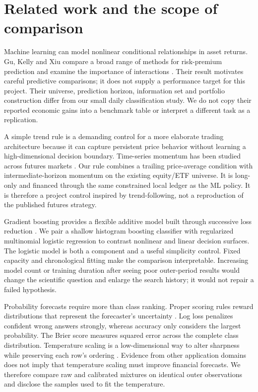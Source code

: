 \section{Related work and the scope of comparison}\label{sec:section-02}

Machine learning can model nonlinear conditional relationships in asset returns. Gu, Kelly and Xiu compare a broad range of methods for risk-premium prediction and examine the importance of interactions \citep{gu2020}. Their result motivates careful predictive comparisons; it does not supply a performance target for this project. Their universe, prediction horizon, information set and portfolio construction differ from our small daily classification study. We do not copy their reported economic gains into a benchmark table or interpret a different task as a replication.

A simple trend rule is a demanding control for a more elaborate trading architecture because it can capture persistent price behavior without learning a high-dimensional decision boundary. Time-series momentum has been studied across futures markets \citep{momentum2012}. Our rule combines a trailing price-average condition with intermediate-horizon momentum on the existing equity/ETF universe. It is long-only and financed through the same constrained local ledger as the ML policy. It is therefore a project control inspired by trend-following, not a reproduction of the published futures strategy.

Gradient boosting provides a flexible additive model built through successive loss reduction \citep{friedman2001}. We pair a shallow histogram boosting classifier with regularized multinomial logistic regression to contrast nonlinear and linear decision surfaces. The logistic model is both a component and a useful simplicity control. Fixed capacity and chronological fitting make the comparison interpretable. Increasing model count or training duration after seeing poor outer-period results would change the scientific question and enlarge the search history; it would not repair a failed hypothesis.

Probability forecasts require more than class ranking. Proper scoring rules reward distributions that represent the forecaster's uncertainty \citep{gneiting2007}. Log loss penalizes confident wrong answers strongly, whereas accuracy only considers the largest probability. The Brier score measures squared error across the complete class distribution. Temperature scaling is a low-dimensional way to alter sharpness while preserving each row's ordering \citep{guo2017}. Evidence from other application domains does not imply that temperature scaling must improve financial forecasts. We therefore compare raw and calibrated mixtures on identical outer observations and disclose the samples used to fit the temperature.

